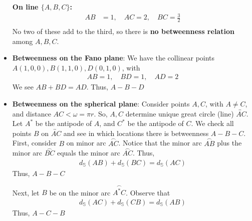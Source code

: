 \documentclass{report}
\begin{document}
\begin{itemize}
            \textbf{On line \(\{A, B, C\}\):}
            \begin{align*}
                AB &= 1, \quad AC = 2, \quad BC = \frac{3}{2} \\
            \end{align*}
            No two of these add to the third, so there is \textbf{no betweenness relation} among \(A, B, C\).
        \item \textbf{Betweenness on the Fano plane}: We have the collinear points $A(1,0,0), B(1,1,0), D(0,1,0)$, with 
            \begin{align*}
                AB =1, \quad BD = 1, \quad AD =2
            \end{align*}
            We see $AB + BD = AD$. Thus, $A-B-D$
        \item \textbf{Betweenness on the spherical plane}: Consider points $A, C$, with $A \ne C$, and distance $AC < \omega = \pi r$. So, $A,C$ determine unique great circle (line) $\overleftrightarrow{AC}$. Let $A^{*}$ be the antipode of $A$, and $C^{*}$ be the antipode of $C$. We check all points $B$ on $\overleftrightarrow{AC}$  and see in which locations there is betweenness $A-B-C$.
            \bigbreak \noindent 
            First, consider $B$ on minor arc $\overset{\frown}{AC}$. Notice that the minor arc $\overset{\frown}{AB}$ plus the minor arc $\overset{\frown}{BC}$ equals the minor arc $\overset{\frown}{AC}$. Thus,
            \begin{align*}
                d_{\mathbb{S}}(AB) + d_{\mathbb{S}}(BC) = d_{\mathbb{S}}(AC)
            \end{align*}
            Thus, $A-B-C$
            \bigbreak \noindent 
            \begin{figure}[ht]
                \centering
                \label{fig:minor1}
            \end{figure}
            \bigbreak \noindent 
            Next, let $B$ be on the minor arc $\overset{\frown}{A^{*}C}$. Observe that
            \begin{align*}
               d_{\mathbb{S}}(AC) + d_{\mathbb{S}}(CB) =  d_{\mathbb{S}}(AB)
            \end{align*}
            Thus, $A-C-B $
            \bigbreak \noindent 
            \begin{figure}[ht]
                \centering
                \label{fig:overset}
            \end{figure}
            \bigbreak \noindent 

\end{itemize}
\end{document}
